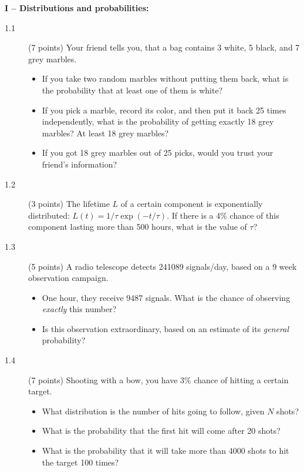 \documentclass[11pt]{article}
\begin{document}
\vspace{4ex}
\noindent
{\bf I -- Distributions and probabilities:}
\begin{description}
  \item[1.1] (7 points)
  Your friend tells you, that a bag contains 3 white, 5 black, and 7 grey marbles.
  \vspace*{-1ex}
  \begin{itemize}
  \item If you take two random marbles without putting them back, what is the probability that at
    least one of them is white?
    \item If you pick a marble, record its color, and then put it back 25 times independently,
      what is the probability of getting exactly 18 grey marbles? At least 18 grey marbles?
    \item If you got 18 grey marbles out of 25 picks, would you trust your friend's information?
  \end{itemize}
%
  \item[1.2] (3 points)
    The lifetime $L$ of a certain component is exponentially distributed: $L(t) = 1/\tau \exp(-t/\tau)$.
    If there is a 4\% chance of this component lasting more than 500 hours, what is the value of $\tau$?
%
  \item[1.3] (5 points)
   A radio telescope detects 241089 signals/day, based on a 9 week observation campaign.
   \vspace*{-4ex}
   \begin{itemize}
     \item One hour, they receive 9487 signals. What is the chance of observing \emph{exactly} this number?
     \item Is this observation extraordinary, based on an estimate of its \emph{general} probability?
   \end{itemize}
%
  \item[1.4] (7 points)
  Shooting with a bow, you have 3\% chance of hitting a certain target.
  \vspace*{-1ex}
  \begin{itemize}
    \item What distribution is the number of hits going to follow, given $N$ shots?
    \item What is the probability that the first hit will come after 20 shots?
    \item What is the probability that it will take more than 4000 shots to hit the target 100 times?
  \end{itemize}
\end{description}
\end{document}
